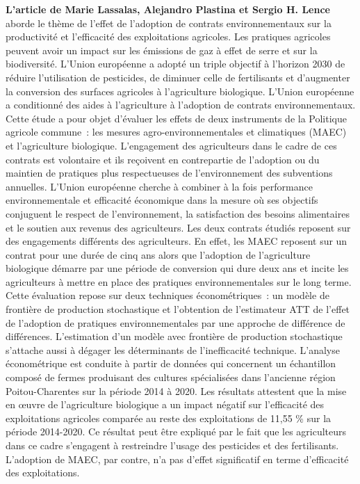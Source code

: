 \begin{Article}
\begin{refsection}[Intro]
\textbf{L'article de Marie Lassalas, Alejandro Plastina et Sergio H.
Lence} aborde le thème de l'effet de l'adoption de contrats
environnementaux sur la productivité et l'efficacité des exploitations
agricoles. Les pratiques agricoles peuvent avoir un impact sur les
émissions de gaz à effet de serre et sur la biodiversité. L'Union
européenne a adopté un triple objectif à l'horizon 2030 de réduire
l'utilisation de pesticides, de diminuer celle de fertilisants et
d'augmenter la conversion des surfaces agricoles à l'agriculture
biologique. L'Union européenne a conditionné des aides à l'agriculture à
l'adoption de contrats environnementaux. Cette étude a pour objet
d'évaluer les effets de deux instruments de la Politique agricole
commune~: les mesures agro-environnementales et climatiques (MAEC) et
l'agriculture biologique. L'engagement des agriculteurs dans le cadre de
ces contrats est volontaire et ils reçoivent en contrepartie de
l'adoption ou du maintien de pratiques plus respectueuses de
l'environnement des subventions annuelles. L'Union européenne cherche à
combiner à la fois performance environnementale et efficacité économique
dans la mesure où ses objectifs conjuguent le respect de l'environnement,
la satisfaction des besoins alimentaires et le soutien aux revenus des
agriculteurs. Les deux contrats étudiés reposent sur des engagements
différents des agriculteurs. En effet, les MAEC reposent sur un contrat
pour une durée de cinq ans alors que l'adoption de l'agriculture biologique démarre
par une période de conversion qui dure deux ans et incite les
agriculteurs à mettre en place des pratiques environnementales sur le long
terme. Cette évaluation repose sur deux techniques économétriques~: un
modèle de frontière de production stochastique et l'obtention de
l'estimateur ATT de l'effet de l'adoption de pratiques environnementales
par une approche de différence de différences. L'estimation d'un modèle
avec frontière de production stochastique s'attache aussi à dégager les
déterminants de l'inefficacité technique. L'analyse économétrique est
conduite à partir de données qui concernent un échantillon composé de fermes
produisant des cultures spécialisées dans l'ancienne région
Poitou-Charentes sur la période 2014 à 2020. Les résultats attestent que
la mise en œuvre de l'agriculture biologique a un impact négatif sur
l'efficacité des exploitations agricoles comparée au reste des
exploitations de 11,55 \% sur la période 2014-2020. Ce résultat peut être
expliqué par le fait que les agriculteurs dans ce cadre s'engagent à
restreindre l'usage des pesticides et des fertilisants. L'adoption de
MAEC, par contre, n'a pas d'effet significatif en terme d'efficacité des
exploitations.


\end{refsection}
\end{Article}
